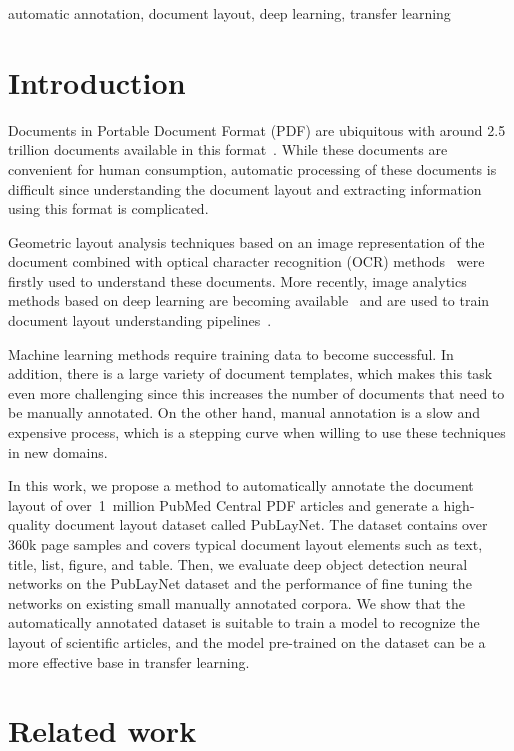 \documentclass[conference]{IEEEtran}
\begin{document}
\begin{IEEEkeywords}
automatic annotation, document layout, deep learning, transfer learning
\end{IEEEkeywords}

\section{Introduction}

Documents in Portable Document Format (PDF) are ubiquitous with around 2.5 trillion documents available in this format~\cite{staar2018ccs}.
While these documents are convenient for human consumption, automatic processing of these documents is difficult since understanding the document layout and extracting information using this format is complicated.

Geometric layout analysis techniques based on an image representation of the document combined with optical character recognition (OCR) methods~\cite{cattoni1998geometric,breuel2002two,breuel2003high} were firstly used to understand these documents.
More recently, image analytics methods based on deep learning are becoming available~\cite{he2017mask} and are used to train document layout understanding pipelines~\cite{staar2018ccs,schreiber2017deepdesrt}.

Machine learning methods require training data to become successful.
In addition, there is a large variety of document templates, which makes this task even more challenging since this increases the number of documents that need to be manually annotated.
On the other hand, manual annotation is a slow and expensive process, which is a stepping curve when willing to use these techniques in new domains.

In this work, we propose a method to automatically annotate the document layout of over~1~million PubMed Central\textsuperscript{\texttrademark} PDF articles and generate a high-quality document layout dataset called PubLayNet. The dataset contains over 360k page samples and covers typical document layout elements such as text, title, list, figure, and table. Then, we evaluate deep object detection neural networks on the PubLayNet dataset and the performance of fine tuning the networks on existing small manually annotated corpora. We show that the automatically annotated dataset is suitable to train a model to recognize the layout of scientific articles, and the model pre-trained on the dataset can be a more effective base in transfer learning.

\section{Related work}
\end{document}
